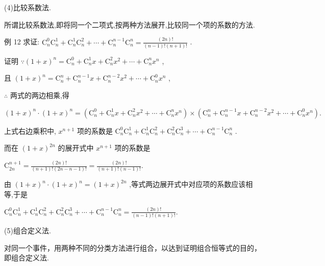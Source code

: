 \documentclass[10pt]{article}
\begin{document}
(4)比较系数法.

所谓比较系数法,即将同一个二项式,按两种方法展开,比较同一个项的系数的方法.

例 12 求证: \({\mathrm{C}}_{n}^{0}{\mathrm{C}}_{n}^{1} + {\mathrm{C}}_{n}^{1}{\mathrm{C}}_{n}^{2} + \cdots  + {\mathrm{C}}_{n}^{n - 1}{\mathrm{C}}_{n}^{n} = \frac{\left( {2n}\right) !}{\left( {n - 1}\right) !\left( {n + 1}\right) !}\) .

证明 \(\because {\left( 1 + x\right) }^{n} = {\mathrm{C}}_{n}^{0} + {\mathrm{C}}_{n}^{1}x + {\mathrm{C}}_{n}^{2}{x}^{2} + \cdots  + {\mathrm{C}}_{n}^{n}{x}^{n}\) ,

且 \({\left( 1 + x\right) }^{n} = {\mathrm{C}}_{n}^{n} + {\mathrm{C}}_{n}^{n - 1}x + {\mathrm{C}}_{n}^{n - 2}{x}^{2} + \cdots  + {\mathrm{C}}_{n}^{0}{x}^{n}\) ,

\(\therefore\) 两式的两边相乘,得

\({\left( 1 + x\right) }^{n} \cdot  {\left( 1 + x\right) }^{n} = \left( {{\mathrm{C}}_{n}^{0} + {\mathrm{C}}_{n}^{1}x + {\mathrm{C}}_{n}^{2}{x}^{2} + \cdots  + {\mathrm{C}}_{n}^{n}{x}^{n}}\right)  \times  \left( {{\mathrm{C}}_{n}^{n} + {\mathrm{C}}_{n}^{n - 1}x + {\mathrm{C}}_{n}^{n - 2}{x}^{2} + \cdots  + {\mathrm{C}}_{n}^{0}{x}^{n}}\right) .\)

上式右边乘积中, \({x}^{n + 1}\) 项的系数是 \({\mathrm{C}}_{n}^{0}{\mathrm{C}}_{n}^{1} + {\mathrm{C}}_{n}^{1}{\mathrm{C}}_{n}^{2} + {\mathrm{C}}_{n}^{2}{\mathrm{C}}_{n}^{3} + \cdots  + {\mathrm{C}}_{n}^{n - 1}{\mathrm{C}}_{n}^{n}\) .

而在 \({\left( 1 + x\right) }^{2n}\) 的展开式中 \({x}^{n + 1}\) 项的系数是

\({\mathrm{C}}_{2n}^{n + 1} = \frac{\left( {2n}\right) !}{\left( {n + 1}\right) !\left( {{2n} - n - 1}\right) !} = \frac{\left( {2n}\right) !}{\left( {n + 1}\right) !\left( {n - 1}\right) !}.\)

由 \({\left( 1 + x\right) }^{n} \cdot  {\left( 1 + x\right) }^{n} = {\left( 1 + x\right) }^{2n}\) ,等式两边展开式中对应项的系数应该相等,于是

\({\mathrm{C}}_{n}^{0}{\mathrm{C}}_{n}^{1} + {\mathrm{C}}_{n}^{1}{\mathrm{C}}_{n}^{2} + {\mathrm{C}}_{n}^{2}{\mathrm{C}}_{n}^{3} + \cdots  + {\mathrm{C}}_{n}^{n - 1}{\mathrm{C}}_{n}^{n} = \frac{\left( {2n}\right) !}{\left( {n - 1}\right) !\left( {n + 1}\right) !}.\)

(5)组合定义法.

对同一个事件，用两种不同的分类方法进行组合，以达到证明组合恒等式的目的，即组合定义法.
\end{document}
